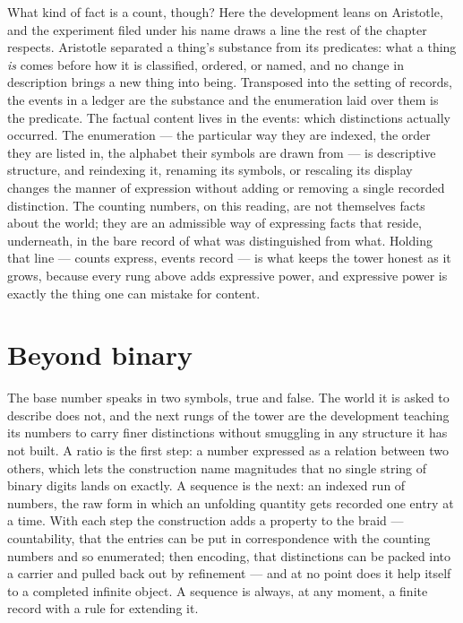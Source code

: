 What kind of fact is a count, though? Here the development leans on Aristotle, and the experiment filed
under his name draws a line the rest of the chapter respects. Aristotle separated a thing's substance
from its predicates: what a thing \emph{is} comes before how it is classified, ordered, or named, and
no change in description brings a new thing into being. Transposed into the setting of records, the
events in a ledger are the substance and the enumeration laid over them is the predicate. The factual
content lives in the events: which distinctions actually occurred. The enumeration --- the particular
way they are indexed, the order they are listed in, the alphabet their symbols are drawn from --- is
descriptive structure, and reindexing it, renaming its symbols, or rescaling its display changes the
manner of expression without adding or removing a single recorded distinction. The counting numbers,
on this reading, are not themselves facts about the world; they are an admissible way of expressing
facts that reside, underneath, in the bare record of what was distinguished from what. Holding that
line --- counts express, events record --- is what keeps the tower honest as it grows, because every
rung above adds expressive power, and expressive power is exactly the thing one can mistake for
content.

\section{Beyond binary}
\label{se:beyond-binary}

The base number speaks in two symbols, true and false. The world it is asked to describe does not, and
the next rungs of the tower are the development teaching its numbers to carry finer distinctions
without smuggling in any structure it has not built. A ratio is the first step: a number expressed as
a relation between two others, which lets the construction name magnitudes that no single string of
binary digits lands on exactly. A sequence is the next: an indexed run of numbers, the raw form in
which an unfolding quantity gets recorded one entry at a time. With each step the construction adds a
property to the braid --- countability, that the entries can be put in correspondence with the
counting numbers and so enumerated; then encoding, that distinctions can be packed into a carrier and
pulled back out by refinement --- and at no point does it help itself to a completed infinite object.
A sequence is always, at any moment, a finite record with a rule for extending it.


